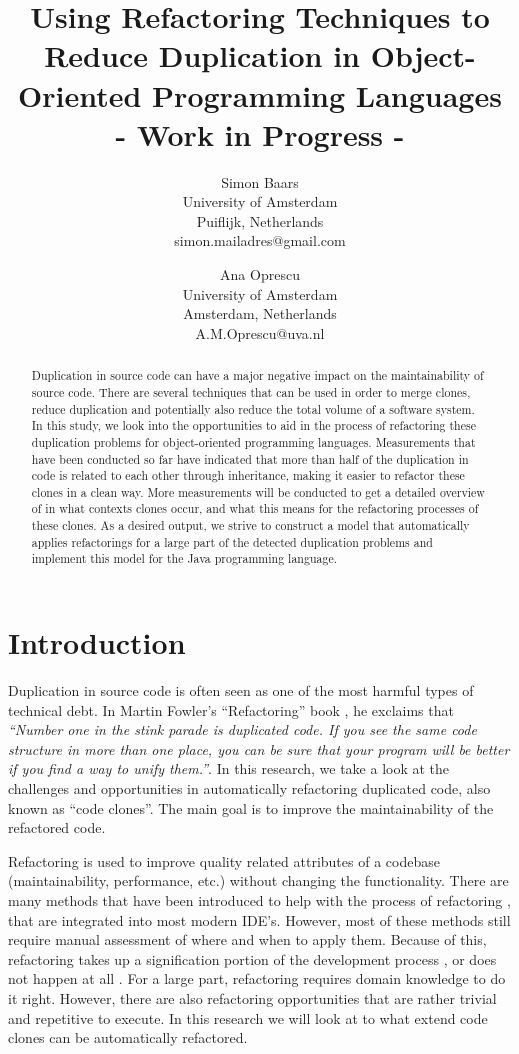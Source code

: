 \documentclass[a4paper]{article}
\title{Using Refactoring Techniques to Reduce Duplication in Object-Oriented Programming Languages\\- Work in Progress -}
\author{
Simon Baars \\ University of Amsterdam\\
                Puiflijk, Netherlands \\ simon.mailadres@gmail.com
\and
Ana Oprescu \\ University of Amsterdam\\
                Amsterdam, Netherlands \\ A.M.Oprescu@uva.nl
}
\begin{document}
\maketitle

\begin{abstract}
Duplication in source code can have a major negative impact on the maintainability of source code. There are several techniques that can be used in order to merge clones, reduce duplication and potentially also reduce the total volume of a software system. In this study, we look into the opportunities to aid in the process of refactoring these duplication problems for object-oriented programming languages. Measurements that have been conducted so far have indicated that more than half of the duplication in code is related to each other through inheritance, making it easier to refactor these clones in a clean way. More measurements will be conducted to get a detailed overview of in what contexts clones occur, and what this means for the refactoring processes of these clones. As a desired output, we strive to construct a model that automatically applies refactorings for a large part of the detected duplication problems and implement this model for the Java programming language.
\end{abstract}


\section{Introduction}
Duplication in source code is often seen as one of the most harmful types of technical debt. In Martin Fowler's ``Refactoring'' book \cite{fowler2018refactoring}, he exclaims that \textit{``Number one in the stink parade is duplicated code. If you see the same code structure in more than one place, you can be sure that your program will be better if you find a way to unify them.''}. In this research, we take a look at the challenges and opportunities in automatically refactoring duplicated code, also known as ``code clones''. The main goal is to improve the maintainability of the refactored code.

Refactoring is used to improve quality related attributes of a codebase (maintainability, performance, etc.) without changing the functionality. There are many methods that have been introduced to help with the process of refactoring \cite{fowler2018refactoring, wake2004refactoring}, that are integrated into most modern IDE's. %
However, most of these methods still require manual assessment of where and when to apply them. Because of this, refactoring takes up a signification portion of the development process \cite{lientz1978characteristics, mens2004survey}, or does not happen at all \cite{mens2003refactoring}. For a large part, refactoring requires domain knowledge to do it right. However, there are also refactoring opportunities that are rather trivial and repetitive to execute. In this research we will look at to what extend code clones can be automatically refactored.
\end{document}
